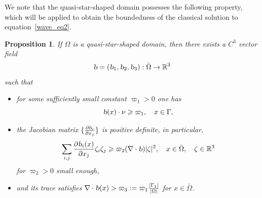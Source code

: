 \documentclass{elsarticle}
\newtheorem{proposition}{Proposition}[section]
\begin{document}
We note that the quasi-star-shaped domain possesses the following property, which will be applied to obtain the boundedness of the classical solution to equation~\eqref{wave_eq2}.
\begin{proposition}\label{quasi_star}
If $\Omega$ is a quasi-star-shaped domain, then there exists a $C^3$ vector field 
\[
	\textsl{b}=(\textsl{b}_1, \textsl{b}_2, \textsl{b}_3): \bar{\Omega}\rightarrow\mathbb{R}^3
\]
such that 
\begin{itemize}
\item[{\rm(1)}] for some sufficiently small constant $\varpi_1 >0$ one has
	\begin{equation}\label{qstar_sign_2}
		 \textsl{b}(x)\cdot\nu \geqslant \varpi_1, \quad x\in\Gamma,
	\end{equation}
\item[{\rm(2)}] the Jacobian matrix $\{\frac{\partial \textsl{b}_{i}}{\partial x_j}\}$ is positive definite, in particular,
	\begin{equation}\label{qstar_Jacobi_2}
		\sum_{i, j}\frac{\partial \textsl{b}_{i}(x)}{\partial x_j}\zeta_i\zeta_j \geqslant \varpi_2(\nabla\cdot\textsl{b})|\zeta|^2,\quad x\in\bar{\Omega}, \quad \zeta\in\mathbb{R}^3
	\end{equation}
	for $\varpi_2>0$ small enough,
\item[{\rm(3)}] and its trace satisfies $\nabla\cdot\textsl{b}(x) > \varpi_3:=\varpi_1\frac{|\Gamma_1|}{|\Omega|}$ for $x\in\bar{\Omega}$.
\end{itemize} 
\end{proposition}
\end{document}
